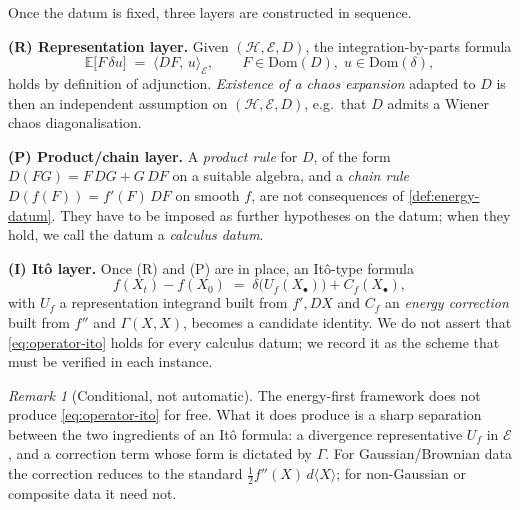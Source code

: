 \documentclass[11pt,reqno]{amsart}
\theoremstyle{plain}
\theoremstyle{definition}
\theoremstyle{remark}
\newtheorem{remark}[theorem]{Remark}
\newcommand{\E}{\mathbb{E}}
\newcommand{\Hilb}{\mathcal{H}}
\newcommand{\Dom}{\mathrm{Dom}}
\newcommand{\Energy}{\mathcal{E}}
\newcommand{\Carre}{\Gamma}
\begin{document}
Once the datum is fixed, three layers are constructed in sequence.

\medskip
\noindent\textbf{(R) Representation layer.}
Given $(\Hilb,\Energy,D)$, the integration-by-parts formula
\begin{equation}\label{eq:ibp}
  \E\bigl[F\,\delta u\bigr]
  \;=\;\langle DF,\,u\rangle_{\Energy},\qquad
  F\in\Dom(D),\;u\in\Dom(\delta),
\end{equation}
holds by definition of adjunction. \emph{Existence of a chaos
expansion} adapted to $D$ is then an independent assumption on
$(\Hilb,\Energy,D)$, e.g.~that $D$ admits a Wiener chaos
diagonalisation.

\medskip
\noindent\textbf{(P) Product/chain layer.}
A \emph{product rule} for $D$, of the form
$D(FG)=F\,DG+G\,DF$ on a suitable algebra, and a \emph{chain rule}
$D(f(F))=f'(F)\,DF$ on smooth $f$, are not consequences of
\cref{def:energy-datum}. They have to be imposed as further hypotheses
on the datum; when they hold, we call the datum a \emph{calculus datum}.

\medskip
\noindent\textbf{(I) It\^o layer.}
Once (R) and (P) are in place, an It\^o-type formula
\begin{equation}\label{eq:operator-ito}
  f(X_t)-f(X_0) \;=\; \delta\bigl(U_f(X_\bullet)\bigr) + C_f(X_\bullet),
\end{equation}
with $U_f$ a representation integrand built from $f',DX$ and
$C_f$ an \emph{energy correction} built from $f''$ and $\Carre(X,X)$,
becomes a candidate identity. We do not assert that
\cref{eq:operator-ito} holds for every calculus datum; we record it as
the scheme that must be verified in each instance.

\begin{remark}[Conditional, not automatic]\label{rem:conditional}
The energy-first framework does not produce \cref{eq:operator-ito}
for free. What it does produce is a sharp separation between the
two ingredients of an It\^o formula: a divergence representative
$U_f$ in $\Energy$, and a correction term whose form is dictated by
$\Carre$. For Gaussian/Brownian data the correction reduces to the
standard $\tfrac12 f''(X)\,d\langle X\rangle$; for non-Gaussian or
composite data it need not.
\end{remark}
\end{document}
